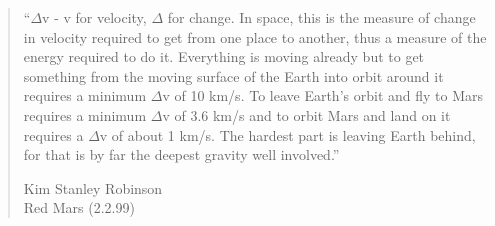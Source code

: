 \phantom{.}
\vspace{0.7in}

\begin{singlespace}
\begin{quote}
``$\Delta$v - v for velocity, $\Delta$ for change. In space, this is the measure of change in velocity required to get from one place to another, thus a measure of the energy required to do it. Everything is moving already but to get something from the moving surface of the Earth into orbit around it requires a minimum $\Delta$v of 10 km/s. To leave Earth's orbit and fly to Mars requires a minimum $\Delta$v of 3.6 km/s and to orbit Mars and land on it requires a $\Delta$v of about 1 km/s. The hardest part is leaving Earth behind, for that is by far the deepest gravity well involved.''

Kim Stanley Robinson\\
Red Mars (2.2.99) 
\end{quote}
\end{singlespace}

%
